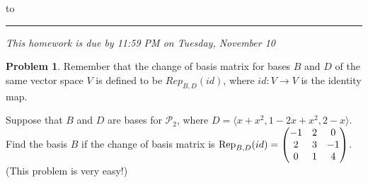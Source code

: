 \documentclass[11pt]{article}
\theoremstyle{definition}
\newtheorem{problem}{Problem}
\newenvironment{answer}{\par\bigskip\bgroup\color{darkblue}}{\egroup}
\begin{document}
\hbox to 
\nointerlineskip
\vskip 2pt
\hrule height 1pt

\medskip

\centerline{\textit{This homework is due by 11:59 PM on Tuesday, November 10}}

\medskip



\begin{problem}
Remember that the change of basis matrix for bases $B$ and $D$ of the same
vector space $V$ is defined to be $Rep_{B,D}(id)$, where $id\colon V\to V$
is the identity map.  

Suppose that $B$ and $D$ are bases for $\mathscr P_2$, where $D=
   \langle x+x^2, 1-2x+x^2, 2-x \rangle$.
Find the basis $B$ if the change of basis matrix is
${\rm Rep}_{B,D}(id) =\begin{pmatrix}
   -1 & 2  & 0\\
    2 & 3  & -1\\
    0 & 1  & 4
\end{pmatrix}$.  (This problem is very easy!)
\end{problem}

\begin{answer}
\end{answer}
\end{document}
